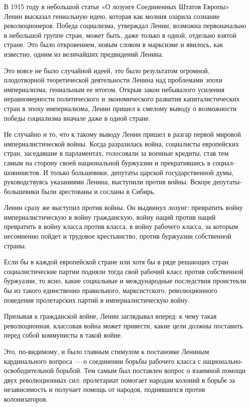 \documentclass[12pt, a4paper, openany]{book}
\begin{document}
В 1915 году в небольшой статье «О лозунге Соединенных Штатов Европы» Ленин высказал гениальную идею, которая как молния озарила сознание революционеров. Победа социализма, утверждал Ленин, возможна первоначально в небольшой группе стран, может быть, даже только в одной, отдельно взятой стране. Это было откровением, новым словом в марксизме и явилось, как известно, одним из величайших предвидений Ленина.

Это вовсе не было случайной идеей, это было результатом огромной, плодотворной теоретической деятельности Ленина над проблемами эпохи империализма, гениальным ее итогом. Открыв закон небывалого усиления неравномерности политического и экономического развития капиталистических стран в эпоху империализма, Ленин пришел к смелому выводу о возможности победы социализма вначале даже в одной стране.

Не случайно и то, что к такому выводу Ленин пришел в разгар первой мировой империалистической войны. Когда разразилась война, социалисты европейских стран, заседавшие в парламентах, голосовали за военные кредиты, став тем самым на сторону своей национальной буржуазии и прекратившись в социал-шовинистов. И только большевики, депутаты царской государственной думы, руководствуясь указаниями Ленина, выступили против войны. Вскоре депутаты-большевики были арестованы и сосланы в Сибирь.

Ленин сразу же выступил против войны. Он выдвинул лозунг: превратить войну империалистическую в войну гражданскую, войну наций против наций превратить в войну класса против класса, в войну рабочего класса, за которым несомненно пойдет и трудовое крестьянство, против буржуазии собственной страны.

Если бы в каждой европейской стране или хотя бы в ряде решающих стран социалистические партии подняли тогда свой рабочий класс против собственной буржуазии, то ясно, какие социальные и международные последствия проистекли бы из такого единственно правильного, марксистского, революционного поведения пролетарских партий в империалистическую войну.

Призывая к гражданской войне, Ленин заглядывал вперед: к чему такая революционная, классовая война может привести, какие цели должны поставить перед собой коммунисты в такой войне.

Это, по-видимому, и было главным стимулом к постановке Лениным кардинального вопроса — о соединении борьбы рабочего класса с национально-освободительной борьбой. Тем самым был поставлен вопрос о взаимной помощи двух революционных сил: пролетариат помогает народам колоний в борьбе за независимость и получает помощь от народов, поднявшихся против колонизаторов.
\end{document}
